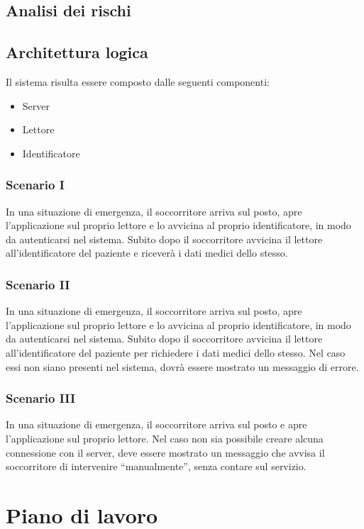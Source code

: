 \documentclass[a4paper,12pt]{report}
\begin{document}
\section{Analisi dei rischi}

\section{Architettura logica}
Il sistema risulta essere composto dalle seguenti componenti:
\begin{itemize}
	\item Server
	\item Lettore
	\item Identificatore
\end{itemize}

\subsection{Scenario I}
In una situazione di emergenza, il soccorritore arriva sul posto, apre l'applicazione sul proprio lettore e lo avvicina al proprio identificatore, in modo da autenticarsi nel sistema. Subito dopo il soccorritore avvicina il lettore all'identificatore del paziente e riceverà i dati medici dello stesso. 
\subsection{Scenario II}
In una situazione di emergenza, il soccorritore arriva sul posto, apre l'applicazione sul proprio lettore e lo avvicina al proprio identificatore, in modo da autenticarsi nel sistema. Subito dopo il soccorritore avvicina il lettore all'identificatore del paziente per richiedere i dati medici dello stesso. Nel caso essi non siano presenti nel sistema, dovrà essere mostrato un messaggio di errore.
\subsection{Scenario III} 
In una situazione di emergenza, il soccorritore arriva sul posto e apre l'applicazione sul proprio lettore. Nel caso non sia possibile creare alcuna connessione con il server, deve essere mostrato un messaggio che avvisa il soccorritore di intervenire ``manualmente'', senza contare sul servizio.



\chapter{Piano di lavoro}
\end{document}
